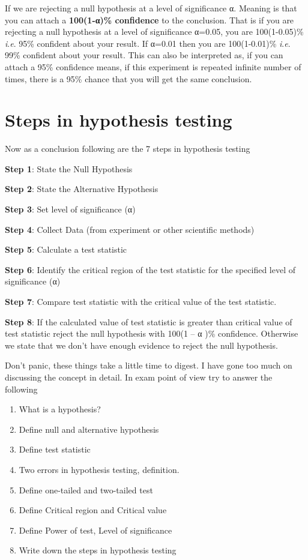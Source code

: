 \documentclass[
]{book}
\begin{document}
If we are rejecting a null hypothesis at a level of significance α. Meaning is that you can attach a \textbf{100(1-α)\% confidence} to the conclusion. That is if you are rejecting a null hypothesis at a level of significance α=0.05, you are 100(1-0.05)\% \emph{i}.\emph{e}. 95\% confident about your result. If α=0.01 then you are 100(1-0.01)\% \emph{i}.\emph{e}. 99\% confident
about your result. This can also be interpreted as, if you can attach a 95\% confidence means, if this experiment is repeated infinite number of times, there is a 95\% chance that you will get the same conclusion.

\hypertarget{steps-in-hypothesis-testing}{%
\section{Steps in hypothesis testing}\label{steps-in-hypothesis-testing}}

Now as a conclusion following are the 7 steps in hypothesis testing

\textbf{Step 1}: State the Null Hypothesis

\textbf{Step 2}: State the Alternative Hypothesis

\textbf{Step 3}: Set level of significance (α)

\textbf{Step 4}: Collect Data (from experiment or other scientific methods)

\textbf{Step 5}: Calculate a test statistic

\textbf{Step 6}: Identify the critical region of the test statistic for the specified level of significance (α)

\textbf{Step 7}: Compare test statistic with the critical value of the test statistic.

\textbf{Step 8}: If the calculated value of test statistic is greater than critical value of test statistic reject the null hypothesis with 100(1 -- α )\% confidence. Otherwise we state that we don't have enough evidence to reject the null hypothesis.

\begin{rmdnote}
Don't panic, these things take a little time to digest. I have gone too much on discussing the concept in detail. In exam point of view try to answer the following

\begin{enumerate}
\def\labelenumi{\arabic{enumi}.}
\item
  What is a hypothesis?
\item
  Define null and alternative hypothesis
\item
  Define test statistic
\item
  Two errors in hypothesis testing, definition.
\item
  Define one-tailed and two-tailed test
\item
  Define Critical region and Critical value
\item
  Define Power of test, Level of significance
\item
  Write down the steps in hypothesis testing
\end{enumerate}
\end{rmdnote}
\end{document}
